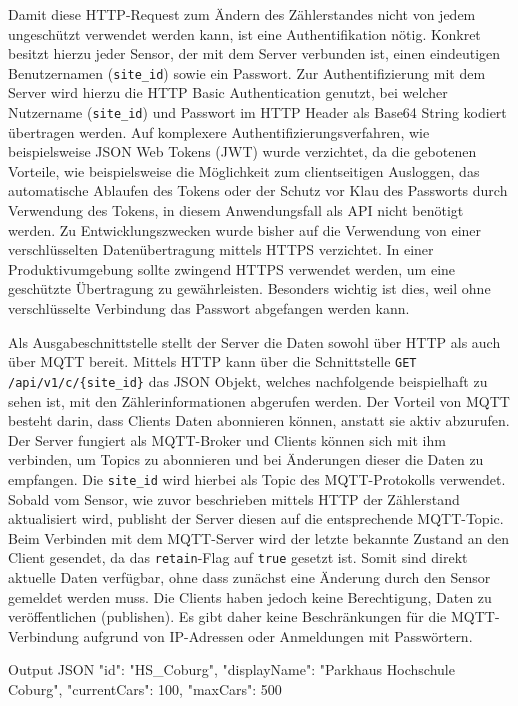 Damit diese HTTP-Request zum Ändern des Zählerstandes nicht von jedem ungeschützt verwendet werden kann, ist eine Authentifikation nötig.
Konkret besitzt hierzu jeder Sensor, der mit dem Server verbunden ist, einen eindeutigen Benutzernamen (\lstinline|site_id|) sowie ein Passwort.
Zur Authentifizierung mit dem Server wird hierzu die HTTP Basic Authentication genutzt, bei welcher Nutzername (\lstinline|site_id|) und Passwort im HTTP Header als Base64 String kodiert übertragen werden.
Auf komplexere Authentifizierungsverfahren, wie beispielsweise JSON Web Tokens (JWT) wurde verzichtet, da die gebotenen Vorteile, wie beispielsweise die Möglichkeit zum clientseitigen Ausloggen, das automatische Ablaufen des Tokens oder der Schutz vor Klau des Passworts durch Verwendung des Tokens, in diesem Anwendungsfall als API nicht benötigt werden.
Zu Entwicklungszwecken wurde bisher auf die Verwendung von einer verschlüsselten Datenübertragung mittels HTTPS verzichtet.
In einer Produktivumgebung sollte zwingend HTTPS verwendet werden, um eine geschützte Übertragung zu gewährleisten.
Besonders wichtig ist dies, weil ohne verschlüsselte Verbindung das Passwort abgefangen werden kann.

Als Ausgabeschnittstelle stellt der Server die Daten sowohl über HTTP als auch über MQTT bereit.
Mittels HTTP kann über die Schnittstelle \lstinline|GET /api/v1/c/{site_id}| das JSON Objekt, welches nachfolgende beispielhaft zu sehen ist, mit den Zählerinformationen abgerufen werden.
Der Vorteil von MQTT besteht darin, dass Clients Daten abonnieren können, anstatt sie aktiv abzurufen.
Der Server fungiert als MQTT-Broker und Clients können sich mit ihm verbinden, um Topics zu abonnieren und bei Änderungen dieser die Daten zu empfangen.
Die \lstinline|site_id| wird hierbei als Topic des MQTT-Protokolls verwendet.
Sobald vom Sensor, wie zuvor beschrieben mittels HTTP der Zählerstand aktualisiert wird, publisht der Server diesen auf die entsprechende MQTT-Topic.
Beim Verbinden mit dem MQTT-Server wird der letzte bekannte Zustand an den Client gesendet, da das \lstinline|retain|-Flag auf \lstinline|true| gesetzt ist.
Somit sind direkt aktuelle Daten verfügbar, ohne dass zunächst eine Änderung durch den Sensor gemeldet werden muss.
Die Clients haben jedoch keine Berechtigung, Daten zu veröffentlichen (publishen).
Es gibt daher keine Beschränkungen für die MQTT-Verbindung aufgrund von IP-Adressen oder Anmeldungen mit Passwörtern.

\lstset{language=json, numbers=none}
\begin{center}
    \begin{mylisting}{Output JSON}
{
    "id": "HS_Coburg",
    "displayName": "Parkhaus Hochschule Coburg",
    "currentCars": 100,
    "maxCars": 500
}
    \end{mylisting}
\end{center}

